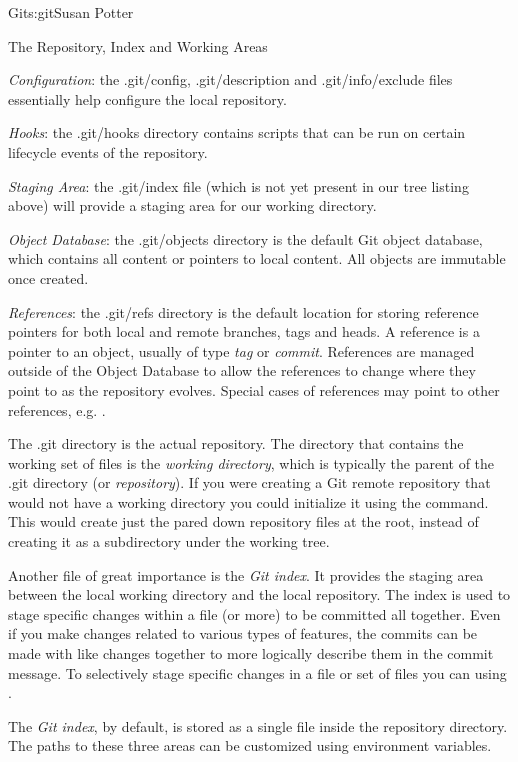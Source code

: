 \begin{aosachapter}{Git}{s:git}{Susan Potter}
\begin{aosasect1}{The Repository, Index and Working Areas}
\begin{aosaitemize}
  \item \emph{Configuration}: the .git/config, .git/description and
  .git/info/exclude files essentially help configure the local repository.
  \item \emph{Hooks}: the .git/hooks directory contains scripts that can
  be run on certain lifecycle events of the repository.
  \item \emph{Staging Area}: the .git/index file (which is not yet
  present in our tree listing above) will provide a staging area for our
  working directory.
  \item \emph{Object Database}: the .git/objects directory is the default
  Git object database, which contains all content or pointers to local
  content. All objects are immutable once created.
  \item \emph{References}: the .git/refs directory is the default location
  for storing reference pointers for both local and remote branches, tags and
  heads. A reference is a pointer to an object, usually of type \emph{tag} or
  \emph{commit}. References are managed outside of the Object Database to
  allow the references to change where they point to as the repository
  evolves. Special cases of references may point to other references, e.g.
  .
\end{aosaitemize}

The .git directory is the actual repository. The directory that contains the
working set of files is the \emph{working directory}, which is typically the
parent of the .git directory (or \emph{repository}). If you were creating a
Git remote repository that would not have a working directory you could
initialize it using the  command. This would create
just the pared down repository files at the root, instead of creating it
as a subdirectory under the working tree.

Another file of great importance is the \emph{Git index}. It provides the
staging area between the local working directory and the local repository.
The index is used to stage specific changes within a file (or more) to
be committed all together. Even if you make changes related to various types
of features, the commits can be made with like changes together to more
logically describe them in the commit message. To selectively stage
specific changes in a file or set of files you can using .

The \emph{Git index}, by default, is stored as a single file inside the
repository directory. The paths to these three areas can be customized
using environment variables.


\end{aosasect1}
\end{aosachapter}
